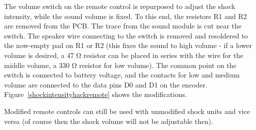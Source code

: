 \documentclass[a4paper]{article}
\begin{document}
The volume switch on the remote control is repurposed to adjust the shock intensity, while the sound volume is fixed. To this end, the resistors R1 and R2 are removed from the PCB. The trace from the sound module is cut near the switch. The speaker wire connecting to the switch is removed and resoldered to the now-empty pad on R1 or R2 (this fixes the sound to high volume - if a lower volume is desired, a 47 \si{\ohm} resistor can be placed in series with the wire for the middle volume, a 330 \si{\ohm} resistor for low volume). The common point on the switch is connected to battery voltage, and the contacts for low and medium volume are connected to the data pins D0 and D1 on the encoder. Figure~\ref{shockintensityhackremote} shows the modifications.

Modified remote controls can still be used with unmodified shock units and vice versa (of course then the shock volume will not be adjustable then).



\end{document}
